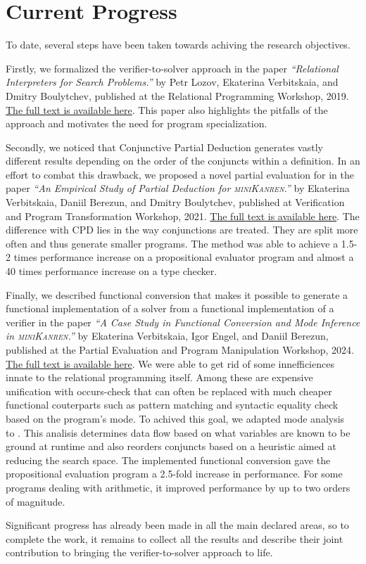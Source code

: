 \section{Current Progress}

To date, several steps have been taken towards achiving the research objectives. 

Firstly, we formalized the verifier-to-solver approach in the paper \emph{``Relational Interpreters for Search Problems.''} by Petr Lozov, Ekaterina Verbitskaia, and Dmitry Boulytchev, published at the  Relational Programming Workshop, 2019. 
\href{https://dash.harvard.edu/bitstream/handle/1/41307116/tr-02-19.pdf?sequence=1&isAllowed=y#page=47}{The full text is available here}. 
This paper also highlights the pitfalls of the approach and motivates the need for program specialization. 

Secondly, we noticed that Conjunctive Partial Deduction generates vastly different results depending on the order of the conjuncts within a definition. 
In an effort to combat this drawback, we proposed a novel partial evaluation for \mk in the paper \emph{``An Empirical Study of Partial Deduction for \textsc{miniKanren}.''} by Ekaterina Verbitskaia, Daniil Berezun, and Dmitry Boulytchev, published at  Verification and Program Transformation Workshop, 2021.
\href{https://cgi.cse.unsw.edu.au/~eptcs/paper.cgi?VPT2021.5.pdf}{The full text is available here}. 
The difference with CPD lies in the way conjunctions are treated. 
They are split more often and thus generate smaller programs. 
The method was able to achieve a 1.5-2 times performance increase on a propositional evaluator program and almost a 40 times performance increase on a type checker. 

Finally, we described functional conversion that makes it possible to generate a functional implementation of a solver from a functional implementation of a verifier in the paper  \emph{``A Case Study in Functional Conversion and Mode Inference in \textsc{miniKanren}.''} by Ekaterina Verbitskaia, Igor Engel, and Daniil Berezun, published at  the Partial Evaluation and Program Manipulation Workshop, 2024. 
\href{https://web.archive.org/web/20240111175807id_/https://dl.acm.org/doi/pdf/10.1145/3635800.3636966}{The full text is available here}.
We were able to get rid of some innefficiences innate to the relational programming itself. 
Among these are expensive unification with occurs-check that can often be replaced with much cheaper functional couterparts such as pattern matching and syntactic equality check based on the program's mode. 
To achived this goal, we adapted mode analysis~\cite{somogyi1987system,smaus2000mode} to \mk. 
This analisis determines data flow based on what variables are known to be ground at runtime and also reorders conjuncts based on a heuristic aimed at reducing the search space.
The implemented functional conversion gave the propositional evaluation program a 2.5-fold increase in performance.
For some programs dealing with arithmetic, it improved performance by up to two orders of magnitude.



Significant progress has already been made in all the main declared areas, so to complete the work, it remains to collect all the results and describe their joint contribution to bringing the verifier-to-solver approach to life. 


